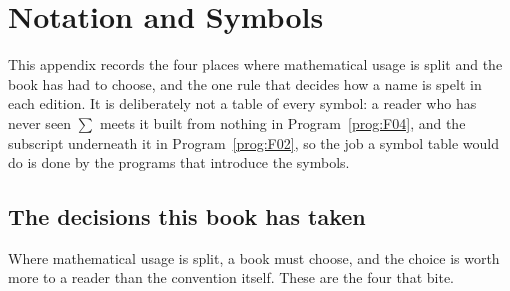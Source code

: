 
\chapter{Notation and Symbols}
\label{app:B}

\noindent
This appendix records the four places where mathematical usage is split and
the book has had to choose, and the one rule that decides how a name is spelt
in each edition. It is deliberately not a table of every symbol: a reader who
has never seen $\sum$ meets it built from nothing in Program~\ref{prog:F04},
and the subscript underneath it in Program~\ref{prog:F02}, so the job a symbol
table would do is done by the programs that introduce the symbols.

\section{The decisions this book has taken}
\label{sec:appB-decisions}

\noindent
Where mathematical usage is split, a book must choose, and the choice is worth
more to a reader than the convention itself. These are the four that bite.

